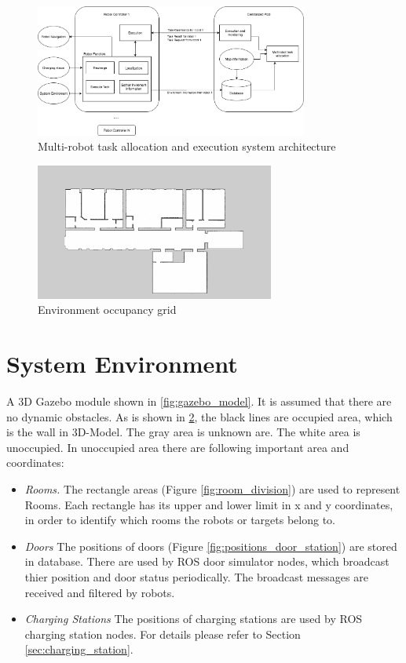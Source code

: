 \begin{figure}[htbp]
	\centering
	\includegraphics[width = 0.8\textwidth]{content/images/ch3/architecture.drawio.png}
	\caption{Multi-robot task allocation and execution system architecture}
	\label{fig:system_architecture}
\end{figure}

\begin{figure}[htbp]
	\centering
	\includegraphics[width = 0.7\textwidth]{content/images/ch3/occupancy_grid.png}
	\caption{Environment occupancy grid}
	\label{fig:occupancy_grid}
\end{figure}

\section{System Environment}
A 3D Gazebo module shown in \ref{fig:gazebo_model}. It is assumed that there are no dynamic obstacles. As is shown in \ref{fig:occupancy_grid}, the black lines are occupied area, which is the wall in 3D-Model. The gray area is unknown are. 
The white area is unoccupied. In unoccupied area there are following important area and coordinates:
\begin{itemize}
	\item \textsl{Rooms.} The rectangle areas (Figure \ref{fig:room_division}) are used to represent Rooms. Each rectangle has its upper and lower limit in x and y coordinates, in order to identify which rooms the robots or targets belong to. 
	\item \textsl{Doors} The positions of doors (Figure \ref{fig:positions_door_station}) are stored in database. There are used by ROS door simulator nodes, which broadcast thier position and door status periodically. The broadcast messages are received and filtered by robots.
	\item \textsl{Charging Stations} The positions of charging stations are used by ROS charging station nodes. For details please refer to Section \ref{sec:charging_station}.
\end{itemize}

